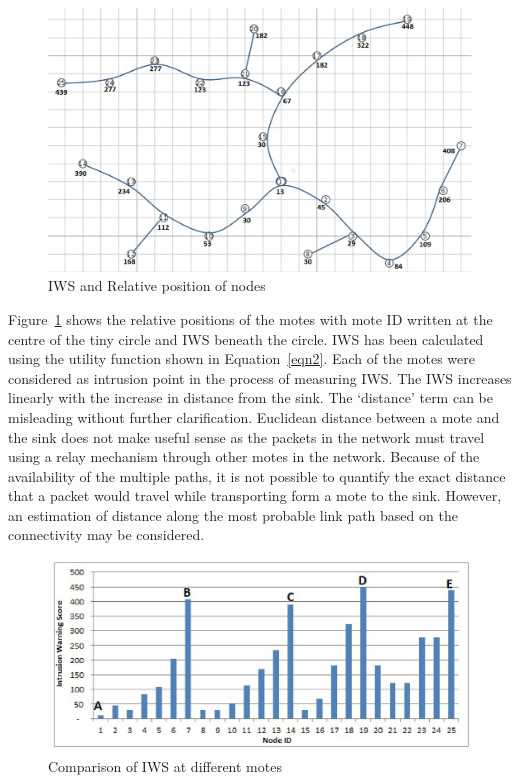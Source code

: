 \documentclass[conference,manuscript]{IEEEtran}
\begin{document}
\begin{figure}[t]
    \centering
        \includegraphics[width=\linewidth]{Tree}
        \caption{IWS and Relative position of nodes}
    \label{fig:elliptopo} 
\end{figure} 
Figure~\ref{fig:elliptopo} shows the relative positions of the motes with mote ID written at the centre of the tiny circle and IWS beneath the circle.
IWS has been calculated using  the utility function shown in Equation~\ref{eqn2}.
Each of the motes were considered as intrusion point in the process of measuring IWS.
The IWS increases linearly with the increase in distance from the sink.
The `distance' term can be misleading without further clarification.
Euclidean distance between a mote and the sink does not make useful sense as the packets in the network must travel using a relay mechanism through other motes in the network.
Because of the availability of the multiple paths, it is not possible to quantify the exact distance that a packet would travel while transporting form a mote to the sink.
However, an estimation of distance along the most probable link path based on the connectivity may be considered.

\begin{figure}[tbph!]
	\centering
        \includegraphics[width=\linewidth]{Tree_column}
        \caption{Comparison of IWS at different motes}
        \label{fig:ellipgraph}
\end{figure}
\end{document}
